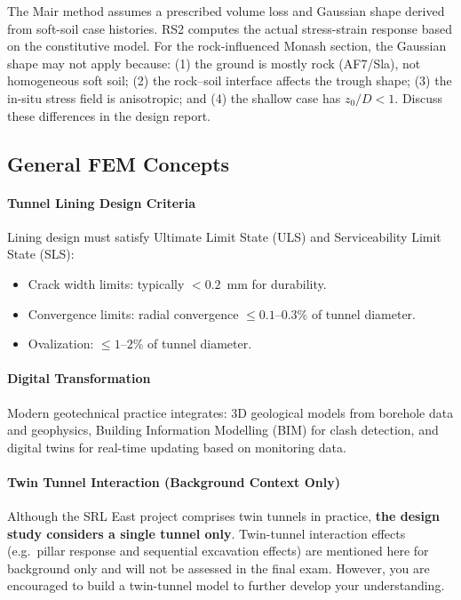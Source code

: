 \begin{warnbox}
The Mair method assumes a prescribed volume loss and Gaussian shape derived from soft-soil case histories. RS2 computes the actual stress-strain response based on the constitutive model. For the rock-influenced Monash section, the Gaussian shape may not apply because: (1) the ground is mostly rock (AF7/Sla), not homogeneous soft soil; (2) the rock--soil interface affects the trough shape; (3) the in-situ stress field is anisotropic; and (4) the shallow case has $z_0/D < 1$. Discuss these differences in the design report.
\end{warnbox}

\subsection{General FEM Concepts}

\paragraph{Tunnel Lining Design Criteria}
Lining design must satisfy Ultimate Limit State (ULS) and Serviceability Limit State (SLS):
\begin{itemize}
 \item Crack width limits: typically $< 0.2$~mm for durability.
 \item Convergence limits: radial convergence $\leq 0.1$--$0.3\%$ of tunnel diameter.
 \item Ovalization: $\leq 1$--$2\%$ of tunnel diameter.
\end{itemize}

\paragraph{Digital Transformation}
Modern geotechnical practice integrates: 3D geological models from borehole data and geophysics, Building Information Modelling (BIM) for clash detection, and digital twins for real-time updating based on monitoring data.

\paragraph{Twin Tunnel Interaction (Background Context Only)}
Although the SRL East project comprises twin tunnels in practice, \textbf{the design study considers a single tunnel only}. Twin-tunnel interaction effects (e.g.\ pillar response and sequential excavation effects) are mentioned here for background only and will not be assessed in the final exam. However, you are encouraged to build a twin-tunnel model to further develop your understanding.

